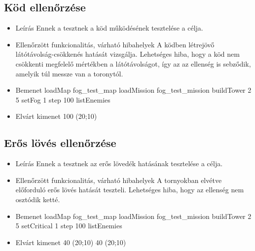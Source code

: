 \subsection{Köd ellenőrzése}
\begin{itemize}
\item Leírás\newline
Ennek a tesztnek a köd működésének tesztelése a célja.
\item Ellenőrzött funkcionalitás, várható hibahelyek\newline
A ködben létrejövő látótávolság-csökkenés hatását vizsgálja. Lehetséges hiba, hogy a köd nem csökkenti megfelelő mértékben a látótávolságot, így az az ellenség is sebződik, amelyik túl messze van a toronytól.
\item Bemenet\newline
loadMap fog\_test\_map\newline
loadMission fog\_test\_mission\newline
buildTower 2 5\newline
setFog 1\newline
step 100\newline
listEnemies\newline
\item Elvárt kimenet 100	(20;10)\newline
\end{itemize}


\subsection{Erős lövés ellenőrzése}
\begin{itemize}
\item Leírás\newline
Ennek a tesztnek az erős lövedék hatásának tesztelése a célja.
\item Ellenőrzött funkcionalitás, várható hibahelyek\newline
A tornyokban elvétve előforduló erős lövés hatását teszteli. Lehetséges hiba, hogy az ellenség nem osztódik ketté.
\item Bemenet\newline
loadMap fog\_test\_map\newline
loadMission fog\_test\_mission\newline
buildTower 2 5\newline
setCritical 1
step 100\newline
listEnemies\newline
\item Elvárt kimenet 40	(20;10) 40	(20;10)\newline
\end{itemize}


